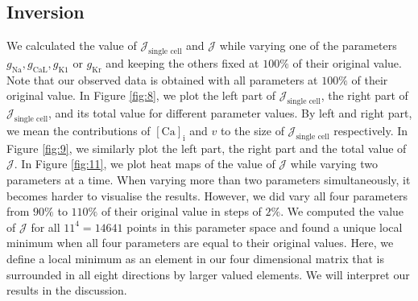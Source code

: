 \documentclass{article}
\begin{document}
\subsection{Inversion} \label{Inversion}
We calculated the value of $\mathcal{J}_{\text{single cell}}$ and $\mathcal{J}$ while varying one of the parameters $g_{\mathrm{Na}}, g_{\mathrm{CaL}}, g_{\mathrm{K1}}$ or $g_{\mathrm{Kr}}$ and keeping the others fixed at $100\%$ of their original value. Note that our observed data is obtained with all parameters at $100\%$ of their original value. In Figure \ref{fig:8}, we plot the left part of $\mathcal{J}_{\text{single cell}}$, the right part of $\mathcal{J}_{\text{single cell}}$, and its total value for different parameter values. By left and right part, we mean the contributions of $[\mathrm{Ca}]_{\mathrm{i}}$ and $v$ to the size of $\mathcal{J}_{\text{single cell}}$ respectively. In Figure \ref{fig:9}, we similarly plot the left part, the right part and the total value of $\mathcal{J}$. In Figure \ref{fig:11}, we plot heat maps of the value of $\mathcal{J}$ while varying two parameters at a time. When varying more than two parameters simultaneously, it becomes harder to visualise the results. However, we did vary all four parameters from $90\%$ to $110\%$ of their original value in steps of $2\%$. We computed the value of $\mathcal{J}$ for all $11^4=14641$ points in this parameter space and found a unique local minimum when all four parameters are equal to their original values. Here, we define a local minimum as an element in our four dimensional matrix that is surrounded in all eight directions by larger valued elements. We will interpret our results in the discussion.
\end{document}
